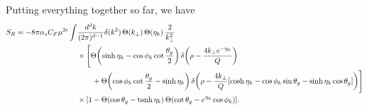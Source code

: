 \documentclass[11pt,twoside,reqno]{amsart}
\theoremstyle{plain}
\theoremstyle{remark}
\theoremstyle{definition}
\theoremstyle{remark}
\theoremstyle{definition}
\theoremstyle{definition}
\begin{document}
	Putting everything together so far, we have
	\begin{equation}
	\begin{aligned}
		S_R = -8\pi\alpha_s C_F\mu^{2\epsilon} \int &\frac{d^d k}{(2\pi)^{d-1}} \delta(k^2)\,\Theta(k_\perp) \,\Theta(\eta_k)\,\frac{2}{k_\perp^2} \\
			&\times \Bigg[ \Theta\qty(\sinh\eta_k - \cos\phi_k\cot\frac{\theta_g}{2})\,\delta\qty(\rho - \frac{4 k_\perp e^{-\eta_k}}{Q}) \\
			&\qquad+ \Theta\qty(\cos\phi_k\cot\frac{\theta_g}{2} - \sinh\eta_k)\, \delta\qty(\rho - \frac{4 k_\perp}{Q}\qty[\cosh\eta_k - \cos\phi_k\sin\theta_g - \sinh\eta_k\cos\theta_g])\Bigg] \\
			&\times \qty[1 - \Theta(\cos\theta_g - \tanh\eta_k)\,\Theta\qty(\cot\theta_g - e^{\eta_k}\cos\phi_k)].
	\end{aligned}
	\end{equation}
\end{document}
